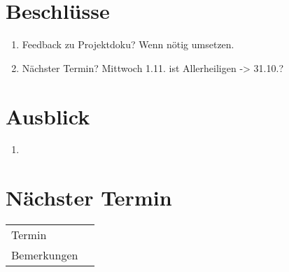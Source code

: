 \documentclass[11pt, a4paper,oneside]{scrartcl}
\begin{document}
\section{Beschlüsse}
\begin{enumerate}
	\item Feedback zu Projektdoku? Wenn nötig umsetzen.
	\item Nächster Termin? Mittwoch 1.11. ist Allerheiligen -> 31.10.?
\end{enumerate}

\section{Ausblick}
\begin{enumerate}
	\item 
\end{enumerate}

\section{Nächster Termin}
\begin{tabu} to \linewidth {l X }
	\toprule
	Termin &  \\
	Bemerkungen & \\
	\bottomrule
\end{tabu}
\end{document}
